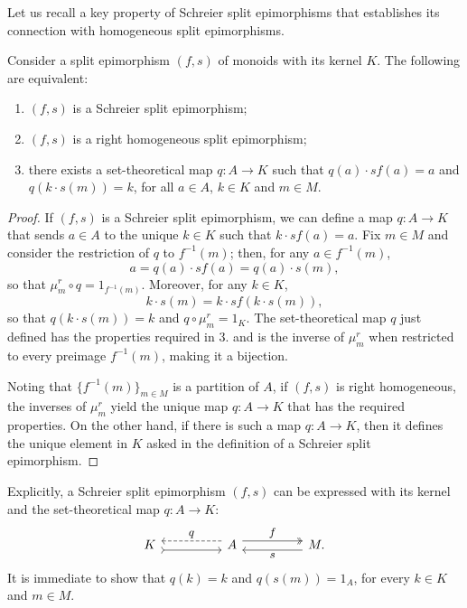 Let us recall a key property of Schreier split epimorphisms that establishes its connection with homogeneous split epimorphisms.
\begin{proposition}
\label{prop:SchreierRightHomo}
    Consider a split epimorphism $(f,s)$ of monoids with its kernel $K$. The following are equivalent:
    \begin{enumerate}
        \item $(f,s)$ is a Schreier split epimorphism;
        \item $(f,s)$ is a right homogeneous split epimorphism;
        \item there exists a set-theoretical map $q:A\to K$ such that $q(a)\cdot sf(a)=a$ and $q(k\cdot s(m))=k$, for all $a\in A$, $k\in K$ and $m\in M$.
    \end{enumerate}
    \begin{proof}
        If $(f,s)$ is a Schreier split epimorphism, we can define a map $q:A\to K$ that sends $a\in A$ to the unique $k\in K$ such that $k\cdot sf(a) = a$. Fix $m\in M$ and consider the restriction of $q$ to $f^{-1}(m)$; then, for any $a\in f^{-1}(m)$,
        \[ a = q(a)\cdot sf(a) = q(a)\cdot s(m), \]
        so that $\mu^r_m\circ q = 1_{f^{-1}(m)}$. Moreover, for any $k\in K$,
        \[ k\cdot s(m) = k\cdot sf(k\cdot s(m)), \]
        so that $q(k\cdot s(m)) = k$ and $q\circ\mu^r_m = 1_K$. The set-theoretical map $q$ just defined has the properties required in $3.$ and is the inverse of $\mu^r_m$ when restricted to every preimage $f^{-1}(m)$, making it a bijection.

        Noting that $\{f^{-1}(m)\}_{m\in M}$ is a partition of $A$, if $(f,s)$ is right homogeneous, the inverses of $\mu^r_m$ yield the unique map $q:A\to K$ that has the required properties. On the other hand, if there is such a map $q:A\to K$, then it defines the unique element in $K$ asked in the definition of a Schreier split epimorphism.
    \end{proof}
\end{proposition}

Explicitly, a Schreier split epimorphism $(f,s)$ can be expressed with its kernel and the set-theoretical map $q:A\to K$:
\begin{equation}
\label{diag:SchreierSplitEpimorphism}
    \begin{tikzcd}[every label/.append style = {font = \small}]
        K \arrow[rr, tail, shift right=1.5] & & A \arrow[ll, "q"', shift right=1.5, dashed] \arrow[rr, "f", two heads, shift left=1.5] & & M. \arrow[ll, "s", shift left=1.5]
    \end{tikzcd}
\end{equation}
It is immediate to show that $q(k) = k$ and $q(s(m))=1_A$, for every $k\in K$ and $m\in M$.
 
